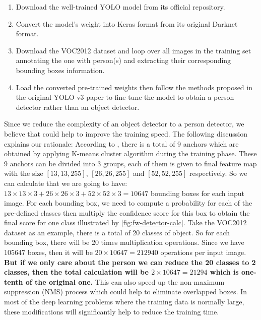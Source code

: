 \begin{enumerate}
    \item Download the well-trained YOLO model from its official repository.
    \item Convert the model's weight into Keras format from its original
    Darknet format.
    \item Download the VOC2012 dataset and loop over all images in the training
    set annotating the one with person(s) and extracting their corresponding
    bounding boxes information.
    \item Load the converted pre-trained weights then follow the methods
    proposed in the original YOLO v3 paper \cite{yolov3-paper-2018} to 
    fine-tune the model to obtain a person detector rather than an object
    detector.
\end{enumerate}

Since we reduce the complexity of an object detector to a person detector,
we believe that could help to improve the training speed. The following 
discussion explains our rationale:
According to \cite{yolov3-paper-2018}, there is a total of 9 anchors which are
obtained by applying K-means cluster algorithm during the training phase. 
These 9 anchors can be divided into 3 groups, each of them is given to final 
feature map with the size $[13, 13, 255]$, $[26, 26, 255]$ and $[52, 52, 255]$ 
respectively. 
So we can calculate that we are going to have:
$13 \times 13 \times 3 + 26 \times 26 \times 3 + 52 \times 52 \times 3=10647$
bounding boxes for each input image. For each bounding box, we need to compute
a probability for each of the pre-defined classes then multiply the confidence score 
for this box to obtain the final score for one class illustrated by
\autoref{fig:fw-detector-calc}. Take the VOC2012 dataset as
an example, there is a total of 20 classes of object. So for each bounding box,
there will be 20 times multiplication operations. Since we have 105647 boxes,
then it will be $20 \times 10647 = 212940$ operations per input image.
\textbf{
    But if we only care about the person we can reduce the 20 classes to 2
    classes, then the total calculation will be $2 \times 10647 = 21294$ which 
    is one-tenth of the original one. 
}
This can also speed up the non-maximum suppression (NMS) process which could 
help to eliminate overlapped boxes.
In most of the deep learning problems where the training data is normally large,
these modifications will significantly help to reduce the training time.

